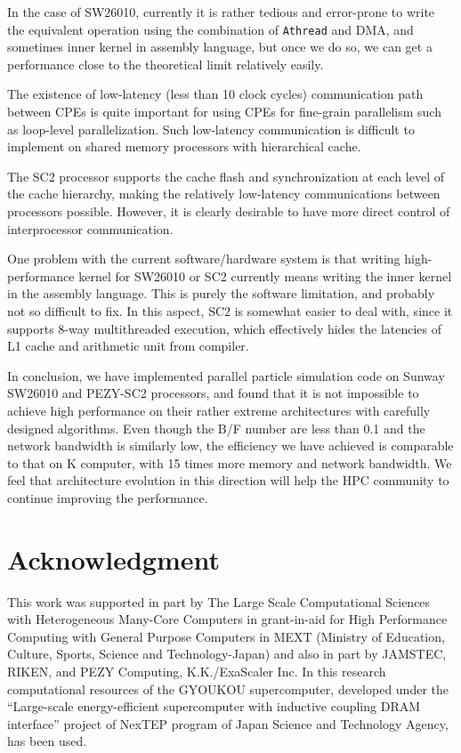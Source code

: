\documentclass[conference]{IEEEtran}
\begin{document}
In the case of SW26010, currently it is rather tedious and error-prone
to write the equivalent operation using the combination of {\tt Athread}  and
DMA, and sometimes inner kernel in assembly language, but once we do
so, we can get a performance close to the theoretical limit
relatively easily.

The existence of low-latency (less than 10 clock cycles) communication
path between CPEs is quite important for using CPEs for fine-grain
parallelism such as loop-level parallelization. Such low-latency
communication is difficult to implement on shared memory processors
with hierarchical cache.

The SC2 processor supports the cache flash and
synchronization at each level of the cache hierarchy, making the
relatively low-latency communications between processors possible.
However, it is clearly desirable to have  more direct control of
interprocessor communication.

One  problem with the current software/hardware system is that writing
high-performance kernel for SW26010 or SC2  currently means writing the inner
kernel in the assembly language. This is purely the software limitation,
and probably not so difficult to fix. In this aspect, SC2 is somewhat
easier to deal with, since it supports 8-way multithreaded execution,
which effectively hides the latencies of L1 cache and arithmetic unit
from compiler. 



In conclusion, we have implemented parallel particle simulation code
on Sunway SW26010 and PEZY-SC2 processors, and found that it is not
impossible to achieve high performance on their rather extreme
architectures with carefully designed algorithms. Even though the B/F
number are less than 0.1  and the network bandwidth is similarly low, the efficiency we
have achieved is comparable to that on K computer, with 15
times more memory and network bandwidth. We feel that architecture
evolution in this direction will help the HPC community to continue
improving the performance.







\section*{Acknowledgment}


This work was supported in part by The Large Scale Computational
Sciences with Heterogeneous Many-Core Computers in grant-in-aid for High
Performance Computing with General Purpose Computers in MEXT (Ministry
of Education, Culture, Sports, Science and Technology-Japan) and  also
in part by  JAMSTEC, RIKEN, and PEZY Computing,
K.K./ExaScaler Inc.
In this research computational resources of the GYOUKOU supercomputer,
developed under the ``Large-scale energy-efficient supercomputer with
inductive coupling DRAM interface'' project of NexTEP program of Japan
Science and Technology Agency, has been used.
\end{document}
